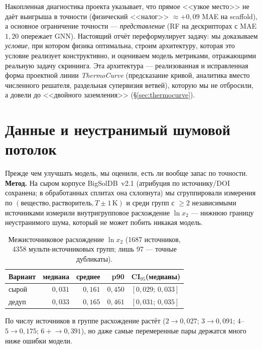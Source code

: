 \documentclass[11pt]{article}
\theoremstyle{plain}
\theoremstyle{definition}
\newcommand{\lnx}{\ln x_2}
\begin{document}
Накопленная диагностика проекта указывает, что прямое <<узкое место>> не даёт
выигрыша в точности (физический <<налог>> $\approx +0{,}09$ MAE на scaffold), а
основное ограничение точности --- \emph{представление} (RF на дескрипторах с
MAE $1{,}20$ опережает GNN). Настоящий отчёт переформулирует задачу: мы
доказываем \emph{условие}, при котором физика оптимальна, строим архитектуру,
которая это условие реализует конструктивно, и оцениваем модель метриками,
отражающими реальную задачу скрининга. Эта архитектура --- реализованная и
исправленная форма проектной линии \emph{ThermoCurve} (предсказание кривой,
аналитика вместо численного решателя, раздельная супервизия ветвей), которую мы
не отбросили, а довели до <<двойного заземления>> (\S\ref{sec:thermocurve}).

\section{Данные и неустранимый шумовой потолок}
\label{sec:noise}
Прежде чем улучшать модель, мы оценили, есть ли вообще запас по точности.
\textbf{Метод.} На сыром корпусе BigSolDB~v2.1 (атрибуция по источнику/DOI
сохранена; в обработанных сплитах она схлопнута) мы сгруппировали измерения по
$(\text{вещество},\text{растворитель},T{\pm}1\,\text{K})$ и среди групп с
$\geq 2$ независимыми источниками измерили внутригрупповое расхождение $\lnx$ ---
нижнюю границу неустранимого шума, который не может побить никакая модель.

\begin{table}[h]
\centering
\caption{Межисточниковое расхождение $\lnx$ (1687 источников, 4358
мульти-источниковых групп; лишь 97 --- точные дубликаты).}
\begin{tabular}{lrrrl}
\toprule
Вариант & медиана & среднее & p90 & CI$_{95}$(медианы) \\
\midrule
сырой & $0{,}031$ & $0{,}161$ & $0{,}450$ & $[0{,}029;\,0{,}033]$ \\
дедуп & $0{,}033$ & $0{,}165$ & $0{,}461$ & $[0{,}031;\,0{,}035]$ \\
\bottomrule
\end{tabular}
\end{table}

\noindent
По числу источников в группе расхождение растёт ($2\!\to\!0{,}027$;
$3\!\to\!0{,}091$; $4$--$5\!\to\!0{,}175$; $6{+}\!\to\!0{,}391$), но даже самые
перемеренные пары держатся много ниже ошибки модели.
\end{document}
